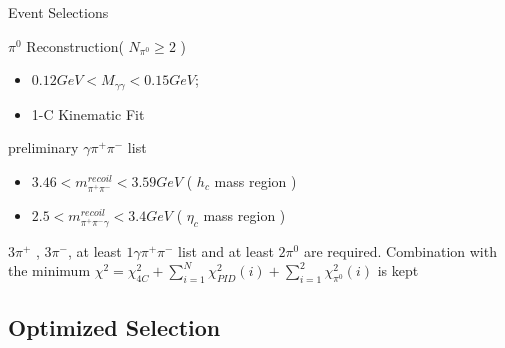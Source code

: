 \documentclass{beamer}
\begin{document}
\begin{frame}{Event Selections}
  \begin{block}{$\pi^0$ Reconstruction( $N_{\pi^0}\geq 2$ )}
    \begin{itemize}
      \item $0.12GeV<M_{\gamma\gamma}<0.15GeV$;
      \item 1-C Kinematic Fit
    \end{itemize}
  \end{block}
  \begin{block}{preliminary $\gamma\pi^+\pi^-$ list}
    \begin{itemize}
      \item $3.46<m_{\pi^+\pi^-}^{recoil}<3.59 GeV$ ( $h_c$ mass region )
      \item $2.5<m_{\pi^+\pi^-\gamma}^{recoil}<3.4 GeV$ ( $\eta_c$ mass region )
    \end{itemize}
  \end{block}
  $3\pi^+$ , $3\pi^-$, at least $1 \gamma\pi^+\pi^-$ list and at least $2\pi^0$ are required.
  Combination with the minimum $\chi^2 = \chi^2_{4C} + \sum^N_{i=1}\chi^2_{PID}(i)+\sum^2_{i=1}\chi^2_{\pi^0}(i)$ is kept 
\end{frame}

\subsection{Optimized Selection}
\end{document}
